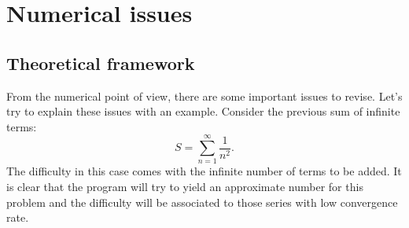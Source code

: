 \newpage 

\section{Numerical issues} \label{sec:NumIssues} 
 
    \subsection{Theoretical framework}
From the numerical point of view, there are some important issues to revise.  
Let's try to explain these issues with an example. 
Consider the previous sum of infinite terms: 
$$
S = \sum_{n=1} ^{\infty} \frac{ 1 } { n^2 }.
$$
The difficulty in this case comes with the infinite number of terms to be added. 
It is clear that the program  will try to yield an 
approximate number for this problem and the difficulty will be associated to those 
series with low convergence rate. 
 

